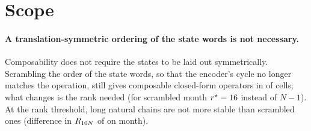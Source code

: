 \section{Scope}\label{sec:scope}
\paragraph{A translation-symmetric ordering of the state words is not necessary.}
Composability does not require the states to be laid out symmetrically. Scrambling the order of the state words, so that the encoder's
cycle no longer matches the operation, still gives composable closed-form operators in \CLelevenScrComposable{} of
\CLelevenScrTotal{} cells; what changes is the rank needed (for scrambled month $r^\star = 16{}$ instead of
$N-1$). At the rank threshold, long natural chains are not more stable than scrambled ones (difference in $R_{10N}$ of
\CLelevenMonthDiff{} on month).

